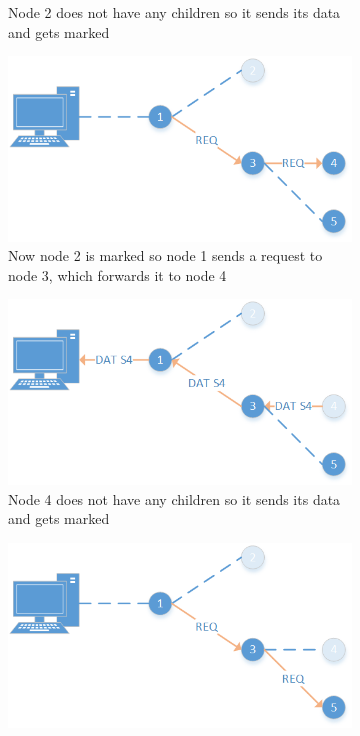 \begin{figure}[htbp]
\begin{subfigure}[t]{0.4\textwidth}
        \caption{Node 2 does not have any children so it sends its data and gets marked}
        \label{fig:coll2}
    \end{subfigure}
    \quad
    \quad
    \begin{subfigure}[t]{0.4\textwidth}
		\centering         
        \includegraphics[scale=0.6]{content/images/Collection/Part3}
        \caption{Now node 2 is marked so node 1 sends a request to node 3, which forwards it to node 4}
        \label{fig:coll3}
    \end{subfigure}
    \quad
    \quad
    \begin{subfigure}[t]{0.4\textwidth}
		\centering         
        \includegraphics[scale=0.6]{content/images/Collection/Part4}
        \caption{Node 4 does not have any children so it sends its data and gets marked}
        \label{fig:coll4}
    \end{subfigure}
    \quad
    \quad
    \begin{subfigure}[t]{0.4\textwidth}
		\centering         
        \includegraphics[scale=0.6]{content/images/Collection/Part5}

\end{subfigure}
\end{figure}
